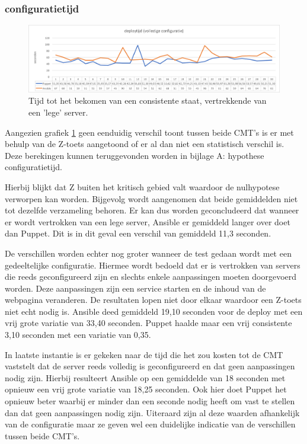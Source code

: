 \subsubsection{\gls{configuratietijd}}
\begin{figure}
  \includegraphics[width=\linewidth]{img/deploytime_fullconfig.png} 
  \caption{Tijd tot het bekomen van een consistente staat, vertrekkende van een 'lege' server.}  
  \label{fig:deploytime_fullconfig}
\end{figure}




Aangezien grafiek \ref{fig:deploytime_fullconfig} geen eenduidig verschil toont tussen beide \gls{CMT}'s is er met behulp van de Z-toets aangetoond of er al dan niet een statistisch verschil is. Deze berekingen kunnen teruggevonden worden in bijlage A: hypothese configuratietijd.

Hierbij blijkt dat Z buiten het kritisch gebied valt waardoor de nulhypotese verworpen kan worden. Bijgevolg wordt aangenomen dat beide gemiddelden niet tot dezelfde verzameling behoren. Er kan dus worden geconcludeerd dat wanneer er wordt vertrokken van een lege server, Ansible er gemiddeld langer over doet dan Puppet. Dit is in dit geval een verschil van gemiddeld 11,3 seconden. 

De verschillen worden echter nog groter wanneer de test gedaan wordt met een gedeeltelijke configuratie. Hiermee wordt bedoeld dat er is vertrokken van servers die reeds geconfigureerd zijn en slechts enkele aanpassingen moeten doorgevoerd worden. Deze aanpassingen zijn een service starten en de inhoud van de webpagina veranderen. De resultaten lopen niet door elkaar waardoor een Z-toets niet echt nodig is. Ansible deed gemiddeld 19,10 seconden voor de deploy met een vrij grote variatie van 33,40 seconden. Puppet haalde maar een vrij consistente 3,10 seconden met een variatie van 0,35.

In laatste instantie is er gekeken naar de tijd die het zou kosten tot de \gls{CMT} vaststelt dat de server reeds volledig is geconfigureerd en dat geen aanpassingen nodig zijn. Hierbij resulteert Ansible op een gemiddelde van 18 seconden met opnieuw een vrij grote variatie van 18,25 seconden. Ook hier doet Puppet het opnieuw beter waarbij er minder dan een seconde nodig heeft om vast te stellen dan dat geen aanpassingen nodig zijn. Uiteraard zijn al deze waarden afhankelijk van de configuratie maar ze geven wel een duidelijke indicatie van de verschillen tussen beide \gls{CMT}'s.

